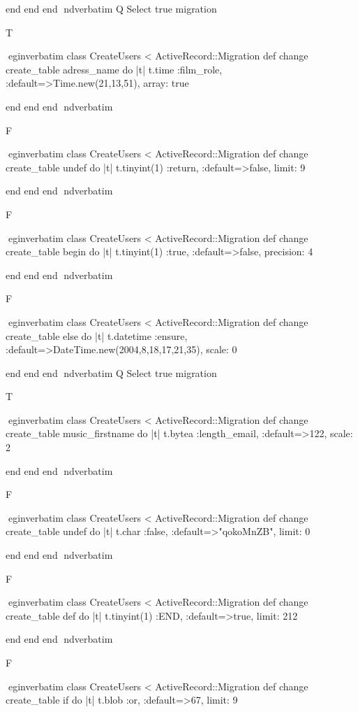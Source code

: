    end 
  end 
end
nd{verbatim}
Q
 Select true migration

T

egin{verbatim}
 class CreateUsers < ActiveRecord::Migration 
  def change 
    create_table adress_name do |t| 
      t.time :film_role, :default=>Time.new(21,13,51), array: true
    
    end 
  end 
end
nd{verbatim}

F

egin{verbatim}
 class CreateUsers < ActiveRecord::Migration 
  def change 
    create_table undef do |t| 
      t.tinyint(1) :return, :default=>false, limit: 9
    
    end 
  end 
end
nd{verbatim}

F

egin{verbatim}
 class CreateUsers < ActiveRecord::Migration 
  def change 
    create_table begin do |t| 
      t.tinyint(1) :true, :default=>false, precision: 4
    
    end 
  end 
end
nd{verbatim}

F

egin{verbatim}
 class CreateUsers < ActiveRecord::Migration 
  def change 
    create_table else do |t| 
      t.datetime :ensure, :default=>DateTime.new(2004,8,18,17,21,35), scale: 0
    
    end 
  end 
end
nd{verbatim}
Q
 Select true migration

T

egin{verbatim}
 class CreateUsers < ActiveRecord::Migration 
  def change 
    create_table music_firstname do |t| 
      t.bytea :length_email, :default=>122, scale: 2
    
    end 
  end 
end
nd{verbatim}

F

egin{verbatim}
 class CreateUsers < ActiveRecord::Migration 
  def change 
    create_table undef do |t| 
      t.char :false, :default=>"qokoMnZB", limit: 0
    
    end 
  end 
end
nd{verbatim}

F

egin{verbatim}
 class CreateUsers < ActiveRecord::Migration 
  def change 
    create_table def do |t| 
      t.tinyint(1) :END, :default=>true, limit: 212
    
    end 
  end 
end
nd{verbatim}

F

egin{verbatim}
 class CreateUsers < ActiveRecord::Migration 
  def change 
    create_table if do |t| 
      t.blob :or, :default=>67, limit: 9
    
